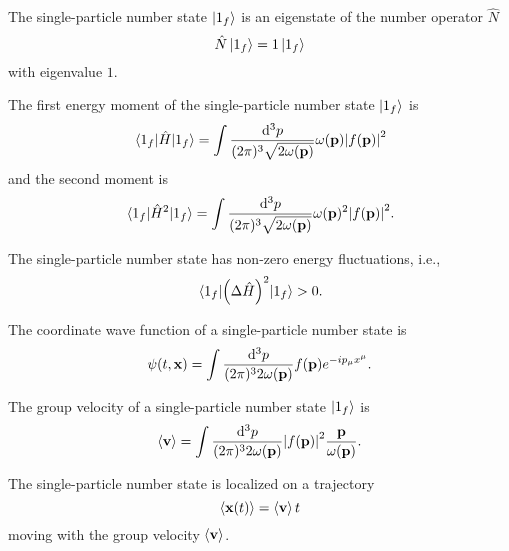 \begin{theorem}\label{thm:single_particle_number_state_number_eigenstate}
	The single-particle number state $\ket{1_f}$ is an eigenstate of the number operator $\hat{N}$
	\begin{equation}
		\hat{N}
		\ket{1_f}
		=
		1
		\ket{1_f}
	\end{equation}
	with eigenvalue $1$.
\end{theorem}
\begin{lemma}\label{thm:single_particle_number_state_energy}
	The first energy moment of the single-particle number state $\ket{1_f}$ is
	\begin{equation}
		\expval{\hat{H}}{1_f}
		=
		\int\frac{\dd[3]{p}}{(2\pi)^3\sqrt{2\omega(\vb{p})}}
		\omega(\vb{p})
		\abs{f(\vb{p})}^2
	\end{equation}
	and the second moment is
	\begin{equation}
		\expval{\hat{H}^2}{1_f}
		=
		\int\frac{\dd[3]{p}}{(2\pi)^3\sqrt{2\omega(\vb{p})}}
		\omega(\vb{p})^2
		\abs{f(\vb{p})}^2
		.
	\end{equation}
\end{lemma}
\begin{corollary}
	The single-particle number state has non-zero energy fluctuations, i.e.,
	\begin{equation}
		\expval{\left(\Delta\hat{H}\right)^2}{1_f}
		>
		0
		.
	\end{equation}
\end{corollary}
\begin{lemma}\label{thm:single_particle_number_state_wave_function}
	The coordinate wave function of a single-particle number state is
	\begin{equation}
		\psi(t,\vb{x})
		=
		\int\frac{\dd[3]{p}}{(2\pi)^32\omega(\vb{p})}
		f(\vb{p})e^{-ip_\mu x^\mu}
		.
	\end{equation}
\end{lemma}
\begin{lemma}\label{thm:single_particle_number_state_group_velocity}
	The group velocity of a single-particle number state $\ket{1_f}$ is
	\begin{equation}
		\expval{\vb{v}}
		=
		\int\frac{\dd[3]{p}}{(2\pi)^32\omega(\vb{p})}
		\abs{f(\vb{p})}^2
		\frac{\vb{p}}{\omega(\vb{p})}
		\label{eq:single_particle_number_state_group_velocity}
		.
	\end{equation}
\end{lemma}
\begin{lemma}
	The single-particle number state is localized on a trajectory
	\begin{equation}
		\expval{\vb{x}(t)}
		=
		\expval{\vb{v}}t
	\end{equation}
	moving with the group velocity $\expval{\vb{v}}$.
\end{lemma}
